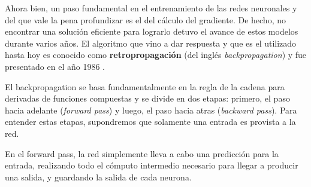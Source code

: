 \documentclass[../../main.tex]{subfiles}
\begin{document}
Ahora bien, un paso fundamental en el entrenamiento de las redes neuronales y del que vale
la pena profundizar es el del cálculo del gradiente. De hecho, no encontrar una solución
eficiente para lograrlo detuvo el avance de estos modelos durante varios años. El algoritmo
que vino a dar respuesta y que es el utilizado hasta hoy es conocido como
\textbf{retropropagación} (del inglés \textit{backpropagation}) y fue presentado en el año
1986 \cite{backprop-1986}.

El backpropagation se basa fundamentalmente en la regla de la cadena para derivadas de
funciones compuestas y se divide en dos etapas: primero, el paso hacia adelante
(\textit{forward pass}) y luego, el paso hacia atras (\textit{backward pass}). Para
entender estas etapas, supondremos que solamente una entrada es provista a la red.

En el forward pass, la red simplemente lleva a cabo una predicción para la entrada,
realizando todo el cómputo intermedio necesario para llegar a producir una salida, y
guardando la salida de cada neurona.
\end{document}
